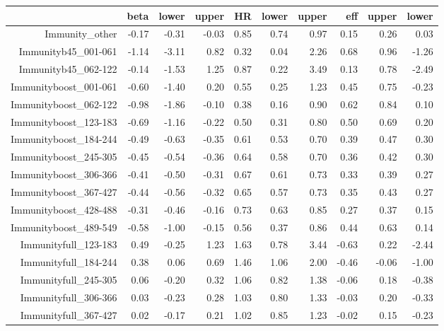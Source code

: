 \begin{table}[ht]
\centering
\begin{tabular}{rrrrrrrrrr}
  \hline
 & beta & lower & upper & HR & lower & upper & eff & upper & lower \\ 
  \hline
Immunity\_other & -0.17 & -0.31 & -0.03 & 0.85 & 0.74 & 0.97 & 0.15 & 0.26 & 0.03 \\ 
  Immunityb45\_001-061 & -1.14 & -3.11 & 0.82 & 0.32 & 0.04 & 2.26 & 0.68 & 0.96 & -1.26 \\ 
  Immunityb45\_062-122 & -0.14 & -1.53 & 1.25 & 0.87 & 0.22 & 3.49 & 0.13 & 0.78 & -2.49 \\ 
  Immunityboost\_001-061 & -0.60 & -1.40 & 0.20 & 0.55 & 0.25 & 1.23 & 0.45 & 0.75 & -0.23 \\ 
  Immunityboost\_062-122 & -0.98 & -1.86 & -0.10 & 0.38 & 0.16 & 0.90 & 0.62 & 0.84 & 0.10 \\ 
  Immunityboost\_123-183 & -0.69 & -1.16 & -0.22 & 0.50 & 0.31 & 0.80 & 0.50 & 0.69 & 0.20 \\ 
  Immunityboost\_184-244 & -0.49 & -0.63 & -0.35 & 0.61 & 0.53 & 0.70 & 0.39 & 0.47 & 0.30 \\ 
  Immunityboost\_245-305 & -0.45 & -0.54 & -0.36 & 0.64 & 0.58 & 0.70 & 0.36 & 0.42 & 0.30 \\ 
  Immunityboost\_306-366 & -0.41 & -0.50 & -0.31 & 0.67 & 0.61 & 0.73 & 0.33 & 0.39 & 0.27 \\ 
  Immunityboost\_367-427 & -0.44 & -0.56 & -0.32 & 0.65 & 0.57 & 0.73 & 0.35 & 0.43 & 0.27 \\ 
  Immunityboost\_428-488 & -0.31 & -0.46 & -0.16 & 0.73 & 0.63 & 0.85 & 0.27 & 0.37 & 0.15 \\ 
  Immunityboost\_489-549 & -0.58 & -1.00 & -0.15 & 0.56 & 0.37 & 0.86 & 0.44 & 0.63 & 0.14 \\ 
  Immunityfull\_123-183 & 0.49 & -0.25 & 1.23 & 1.63 & 0.78 & 3.44 & -0.63 & 0.22 & -2.44 \\ 
  Immunityfull\_184-244 & 0.38 & 0.06 & 0.69 & 1.46 & 1.06 & 2.00 & -0.46 & -0.06 & -1.00 \\ 
  Immunityfull\_245-305 & 0.06 & -0.20 & 0.32 & 1.06 & 0.82 & 1.38 & -0.06 & 0.18 & -0.38 \\ 
  Immunityfull\_306-366 & 0.03 & -0.23 & 0.28 & 1.03 & 0.80 & 1.33 & -0.03 & 0.20 & -0.33 \\ 
  Immunityfull\_367-427 & 0.02 & -0.17 & 0.21 & 1.02 & 0.85 & 1.23 & -0.02 & 0.15 & -0.23 \\ 

\end{tabular}
\end{table}
